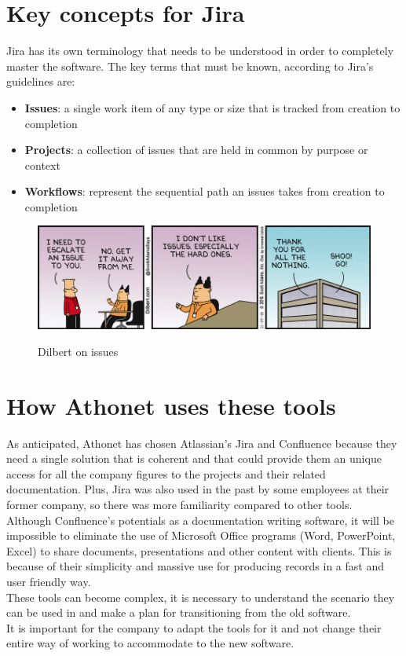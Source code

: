\section{Key concepts for Jira}\label{sec:concepts}
	Jira has its own terminology that needs to be understood in order to completely master the software.
	The key terms that must be known, according to Jira's guidelines\cite{key-terms-to-know} are:
	\begin{itemize}
		\item \textbf{Issues}: a single work item of any type or size that is tracked from creation to completion
		\item \textbf{Projects}: a collection of issues that are held in common by purpose or context
		\item \textbf{Workflows}: represent the sequential path an issues takes from creation to completion
	\end{itemize}
	\begin{figure}[H]
		\centering
		\includegraphics[width=\textwidth]{resources/issues}\\
		\caption{Dilbert on issues}
	\end{figure}
	
\section{How Athonet uses these tools}
	As anticipated, Athonet has chosen Atlassian's Jira and Confluence because they need a single solution that is coherent and that could provide them an unique access for all the company figures to the projects and their related documentation.
	Plus, Jira was also used in the past by some employees at their former company, so there was more familiarity compared to other tools.\\
	Although Confluence's potentials as a documentation writing software, it will be impossible to eliminate the use of Microsoft Office programs (Word, PowerPoint, Excel) to share documents, presentations and other content with clients.
	This is because of their simplicity and massive use for producing records in a fast and user friendly way.\\
	These tools can become complex, it is necessary to understand the scenario they can be used in and make a plan for transitioning from the old software.\\
	It is important for the company to adapt the tools for it and not change their entire way of working to accommodate to the new software.
